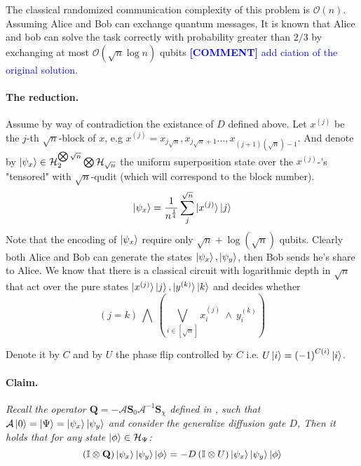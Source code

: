 \documentclass{article}
\newcommand{\commentt}[1]{\textcolor{blue}{ \textbf{[COMMENT]} #1}}
\newcommand{\ctt}[1]{\commentt{#1}}
\newcommand{\onotation}[1]{\(\mathcal{O} \left( {#1}  \right) \)}
\newcommand{\ona}[1]{\onotation{#1}}
\begin{document}
\begin{multicols*}{2}
The classical randomized communication complexity of this problem is \ona{n}.
Assuming Alice and Bob can exchange quantum messages, It is known that Alice and bob can solve the task
correctly with probability greater than \(2/3\) by exchanging at most \ona{\sqrt{n}\log n } qubits \ctt{add ciation of the original solution}. 


\paragraph{The reduction.} 
Assume by way of contradiction the existance of $D$ defined above.  
Let \( x^{(j)} \) be the \(j\)-th \(\sqrt{n}\)-block of \(x\), e.g \(x^{(j)} = x_{j\sqrt{n}},x_{j\sqrt{n}+1}...,x_{(j+1)(\sqrt{n})-1}  \). And denote by \( \ket{\psi_x} \in \mathcal{H}_{2}^{\bigotimes \sqrt{n}} \bigotimes \mathcal{H}_{\sqrt{n}} \) the uniform superposition state over the \( x^{(j)}\)-'s "tensored" with \(\sqrt{n}\)-qudit (which will correspond to the block number). 
\[ \ket{\psi_x} = \frac{1}{n^\frac{1}{4}}\sum_{j}^{\sqrt{n}}\ket{x^{(j)}}\ket{j} \] Note that the encoding of \( \ket{\psi_x} \) require only \( \sqrt{n} + \log(\sqrt{n}) \) qubits.
Clearly both Alice and Bob can generate the states \( \ket{\psi_x}, \ket{\psi_y} \), then Bob sends he's share to Alice.
We know that there is a classical circuit with logarithmic depth in \( \sqrt{n} \) that act over the pure states \( \ket{x^{(j)}}\ket{j} , \ket{y^{(k)}}\ket{k} \) and decides whether \[ \left( j =  k \right) \ \bigwedge  \ \left( \bigvee_{i \in [ \sqrt{n} ] } x^{(j)}_{i} \ \wedge \  y^{(k)}_{i} \right)   \]


Denote it by \( C \) and by \( U \) the phase flip controlled by $C$ i.e. $U\ket{i}=\left( -1 \right)^{C\left( i \right)}\ket{i}$.

\paragraph{Claim.} \textit{ Recall the operator $\mathbf Q  = - {\mathcal A}  {\mathbf S}_0 
  {\mathcal A}^{-1}  {\mathbf S}_\chi$ defined in \cite{Brassard_2002}, such that $ \mathcal A \ket{0} = \ket{\Psi} = \ket{\psi_{x}}\ket{\psi_{y}}$ and 
consider the generalize diffusion gate $D$, Then it holds that for any state $ \ket{\phi} \in \mathcal{H}_{\Psi} $:}
\begin{equation*}
  \left(  \mathbb{I} \otimes \mathbf Q \right) \ket{\psi_{x}}\ket{\psi_{y}} \ket{\phi} =  - D \left( \mathbb{I} \otimes U \right)  \ket{\psi_{x}}\ket{\psi_{y}} \ket{\phi} 
\end{equation*}


\end{multicols*}
\end{document}
